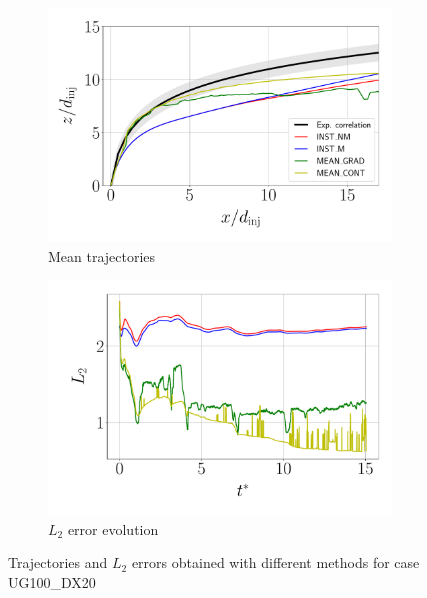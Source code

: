 \begin{figure}[ht]
\centering
\begin{subfigure}[b]{0.45\textwidth}
	\centering
   \includegraphics[scale=0.15]{./part2_developments/figures_ch5_resolved_JICF/results_trajectories/methods_comparison_trajectories_q6uG100.pdf}
   \caption{Mean trajectories}
\end{subfigure}
\hfill
\begin{subfigure}[b]{0.45\textwidth}
	\centering
   \includegraphics[scale=0.15]{./part2_developments/figures_ch5_resolved_JICF/results_trajectories/methods_comparison_L2_evolution_q6uG100.pdf}
   \caption{$L_2$ error evolution}
\end{subfigure}
\caption{Trajectories and $L_2$ errors obtained with different methods for case UG100\_DX20}
\label{fig:JICF_trajectories_and_L2_comparison}
\end{figure}

